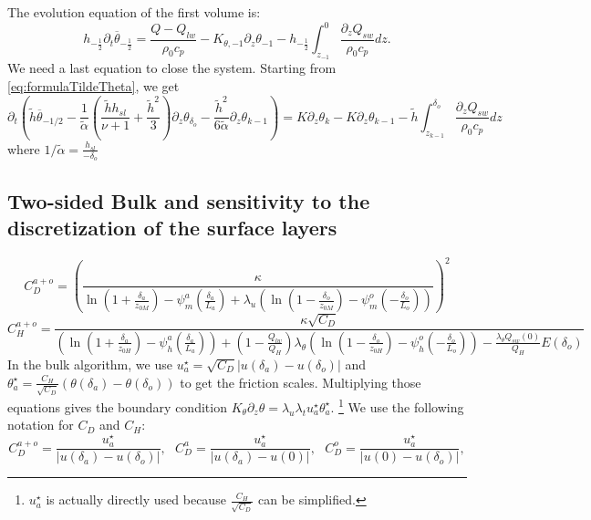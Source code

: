 The evolution equation of the first volume is:
\begin{equation}
h_{-\frac{1}{2}}\partial_t
\overline{\theta}_{-\frac{1}{2}} =
\frac{Q - Q_{lw}}{\rho_0 c_p}
- K_{\theta, -1} \partial_z \theta_{-1}
- h_{-\frac{1}{2}}\int_{z_{-1}}^0
\frac{\partial_z Q_{sw}}{\rho_0 c_p} dz.
\end{equation}
We need a last equation to close the system.
Starting from \eqref{eq:formulaTildeTheta}, we get
\begin{equation}
\partial_t
\left(
\widetilde{h}\overline{\theta}_{-1/2}
-\frac{1}{\widetilde{\alpha}}\left(
\frac{\widetilde{h}h_{sl}}{\nu+1} + \frac{\widetilde{h}^2}{3}
\right)\partial_z \theta_{\delta_o}
- \frac{\widetilde{h}^2}{6\widetilde{\alpha}}
\partial_z \theta_{k-1}
\right)
= K\partial_z \theta_k-
K\partial_z \theta_{k-1}
- \widetilde{h}
\int^{\delta_o}_{z_{k-1}}
\frac{\partial_z Q_{sw}}{\rho_0 c_p} dz
\end{equation}
where 
$1/\widetilde{\alpha}=
\frac{h_{sl}}{-\delta_{o}}$

\subsection{Two-sided Bulk and sensitivity to the discretization
	of the surface layers}
\label{sec:ND_Ocean_bulkRadiativeFluxes}
\begin{equation}
	C_D^{a+o} = \left(\frac{\kappa} {
		\ln(1 + \frac{\delta_a}{z_{0M}}) -
		\psi_m^a(\frac{\delta_a}{L_a})
		+ \lambda_u \left(
		\ln(1 - \frac{\delta_o}{z_{0M}}) -
		\psi_m^o(-\frac{\delta_o}{L_o})
		\right)
	} \right)^2
\end{equation}
\begin{equation}
	C_H^{a+o} = \frac{\kappa \sqrt{C_D}} {
		\left(
			\ln(1 + \frac{\delta_a}{z_{0H}}) -
			\psi_h^a(\frac{\delta_a}{L_a})
		\right)
		+
		(1 - \frac{Q_{lw}}
		{Q_H})
		\lambda_\theta \left(
			\ln(1 - \frac{\delta_o}{z_{0H}}) -
			\psi_h^o(-\frac{\delta_o}{L_o})
		\right)
		- \frac{\lambda_\theta Q_{sw}(0)}
		{Q_H} E(\delta_o)
	}
\end{equation}
In the bulk algorithm, we use $u_a^\star = \sqrt{C_D} |u(\delta_a)-
u(\delta_o)|$ and
$\theta_a^\star = \frac{C_H}{\sqrt{C_D}}(\theta(\delta_a)-
\theta(\delta_o))$ to get the friction scales.
Multiplying those equations gives the boundary condition
$K_\theta \partial_z \theta = \lambda_u \lambda_t u_a^\star \theta_a^\star$.
\footnote{
$u_a^\star$ is actually directly used because $\frac{C_H}{\sqrt{C_D}}$
can be simplified.
}
We use the following notation for $C_D$ and $C_H$:
\begin{equation}
	C_D^{a+o} = \frac{u_a^\star}{|u(\delta_a) - u(\delta_o)|},
	~~~
	C_D^{a} = \frac{u_a^\star}{|u(\delta_a) - u(0)|},
	~~~
	C_D^{o} = \frac{u_a^\star}{|u(0) - u(\delta_o)|},
\end{equation}

